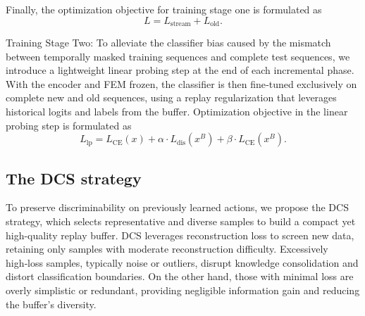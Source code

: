 \documentclass[journal]{IEEEtran}
\begin{document}
Finally, the optimization objective for training stage one is formulated as
\begin{equation}
L = L_{\text{stream}} + L_{\text{old}}.
\end{equation}

Training Stage Two: To alleviate the classifier bias caused by the mismatch between temporally masked training sequences and complete test sequences, we introduce a lightweight linear probing step at the end of each incremental phase. 
With the encoder and FEM frozen, the classifier is then fine‑tuned exclusively on complete new and old sequences, using a replay regularization that leverages historical logits and labels from the buffer.
Optimization objective in the linear probing step is formulated as
\begin{equation}
    L_{\text{lp}} = L_{\text{CE}}(x) + \alpha \cdot L_{\text{dis}}(x^B) + \beta \cdot L_{\text{CE}}(x^B).
\end{equation}

\subsection{The DCS strategy}
To preserve discriminability on previously learned actions, we propose the DCS strategy, which selects representative and diverse samples to build a compact yet high-quality replay buffer.
DCS leverages reconstruction loss to screen new data, retaining only samples with moderate reconstruction difficulty.
Excessively high‑loss samples, typically noise or outliers, disrupt knowledge consolidation and distort classification boundaries.
On the other hand, those with minimal loss are overly simplistic or redundant, providing negligible information gain and reducing the buffer’s diversity.
\end{document}
